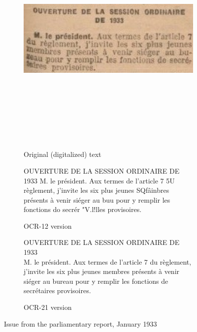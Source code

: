 \documentclass[a4paper,11pt]{article}
\begin{document}
\begin{figure}
\begin{subfigure}{\textwidth}
\begin{center}
	\includegraphics[width=11cm, height=11cm, keepaspectratio]{./img/jo33}\\
	\caption{Original (digitalized) text}
\end{center}
\end{subfigure}
\begin{subfigure}{0.45\textwidth}
	\begin{framed}
OUVERTURE DE LA SESSION ORDINAIRE DE 1933 M. le président. Aux termes de l'article 7 5U règlement, j'invite les six plus jeunes SQfâinbres présents à venir siéger au buu pour y remplir les fonctions do secrér "V.l!lles provisoires.
\end{framed}
	\caption{OCR-12 version}
\end{subfigure}
\begin{subfigure}{0.1\textwidth}
	\hspace{0.8cm}
\end{subfigure}
\begin{subfigure}{0.45\textwidth}
	\begin{framed}
OUVERTURE DE LA SESSION ORDINAIRE DE 1933\\
M. le président. Aux termes de l'article 7 du règlement, j'invite les six plus jeunes membres présents à venir siéger au bureau pour y remplir les fonctions de secrétaires provisoires.
	\end{framed}
	\caption{OCR-21 version}
\end{subfigure}
\caption{Issue from the parliamentary report, January 1933}
\label{fig:data}
\end{figure}
\end{document}
